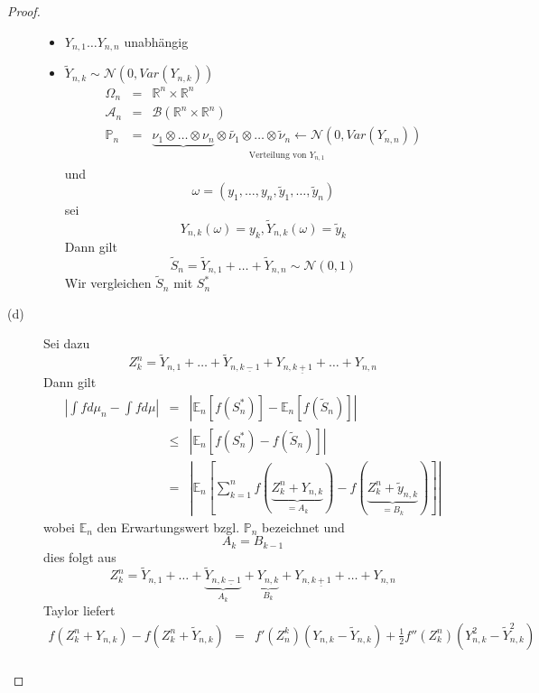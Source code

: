 \documentclass[10pt,a4paper]{report}
\numberwithin{equation}{section}
\numberwithin{figure}{section}
\theoremstyle{plain}
\theoremstyle{definition}
\theoremstyle{remark}
\theoremstyle{plain}
\newcommand{\1}{ \mathbb{1} } %
\begin{document}
\begin{proof}
\begin{description}
\begin{itemize}
\item $Y_{n,1}\ldots Y_{n,n}$ unabhängig
\item $\tilde{Y}_{n,k}\sim\mathcal{N}\left(0,Var\left(Y_{n,k}\right)\right)$
\begin{eqnarray*}
\Omega_{n} & = & \mathbb{R}^{n}\times\mathbb{R}^{n}\\
\mathcal{A}_{n} & = & \mathcal{B}\left(\mathbb{R}^{n}\times\mathbb{R}^{n}\right)\\
\mathbb{P}_{n} & = & \underset{\mbox{Verteilung von }Y_{n,1}}{\underbrace{\nu_{1}\otimes\ldots\otimes\nu_{n}}\otimes\tilde{\nu_{1}}\otimes\ldots\otimes\tilde{\nu}_{n}\leftarrow\mathcal{N}\left(0,Var\left(Y_{n,n}\right)\right)}
\end{eqnarray*}
und 
\[
\omega=\left(y_{1},\ldots,y_{n},\tilde{y}_{1},\ldots,\tilde{y}_{n}\right)
\]
sei 
\[
Y_{n,k}\left(\omega\right)=y_{k},\tilde{Y}_{n,k}\left(\omega\right)=\tilde{y}_{k}
\]
Dann gilt
\[
\tilde{S}_{n}=\tilde{Y}_{n,1}+\ldots+\tilde{Y}_{n,n}\sim\mathcal{N}\left(0,1\right)
\]
Wir vergleichen $\tilde{S}_{n}$ mit $S_{n}^{*}$
\end{itemize}
\item [{(d)}] Sei dazu 
\[
Z_{k}^{n}=\tilde{Y}_{n,1}+\ldots+\tilde{Y}_{n,\underline{k-1}}+Y_{n,\underline{k+1}}+\ldots+Y_{n,n}
\]
Dann gilt
\begin{eqnarray*}
\left|\int fd\mu_{n}-\int fd\mu\right| & = & \left|\mathbb{E}_{n}\left[f\left(S_{n}^{*}\right)\right]-\mathbb{E}_{n}\left[f\left(\tilde{S}_{n}\right)\right]\right|\\
 & \leq & \left|\mathbb{E}_{n}\left[f\left(S_{n}^{*}\right)-f\left(\tilde{S}_{n}\right)\right]\right|\\
 & = & \left|\mathbb{E}_{n}\left[\sum_{k=1}^{n}f\left(\underset{=A_{k}}{\underbrace{Z_{k}^{n}+Y_{n,k}}}\right)-f\left(\underset{=B_{k}}{\underbrace{Z_{k}^{n}+\tilde{y}_{n,k}}}\right)\right]\right|
\end{eqnarray*}
wobei $\mathbb{E}_{n}$ den Erwartungswert bzgl. $\mathbb{P}_{n}$
bezeichnet und 
\[
A_{k}=B_{k-1}
\]
dies folgt aus 
\[
Z_{k}^{n}=\tilde{Y}_{n,1}+\ldots+\underset{A_{k}}{\underbrace{\tilde{Y}_{n,\underline{k-1}}}}+\underset{B_{k}}{\underbrace{Y_{n,k}}}+Y_{n,\underline{k+1}}+\ldots+Y_{n,n}
\]
Taylor liefert 
\begin{eqnarray*}
f\left(Z_{k}^{n}+Y_{n,k}\right)-f\left(Z_{k}^{n}+\tilde{Y}_{n,k}\right) & = & f'\left(Z_{n}^{k}\right)\left(Y_{n,k}-\tilde{Y}_{n,k}\right)+\frac{1}{2}f''\left(Z_{k}^{n}\right)\left(Y_{n,k}^{2}-\tilde{Y}_{n,k}^{2}\right)\\

\end{eqnarray*}
\end{description}
\end{proof}
\end{document}
